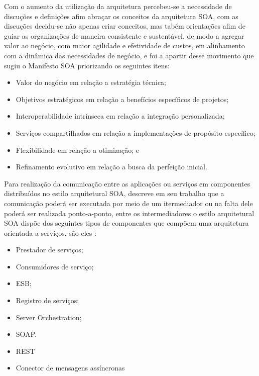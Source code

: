Com o aumento da utilização da arquitetura percebeu-se a necessidade de discuções e definições afim abraçar os conceitos da arquitetura \acrshort{SOA}, com as discuções decidu-se não apenas criar conceitos, mas tabém orientações  afim  de guiar as organizações de maneira consistente e sustentável, de modo a agregar valor ao negócio, com maior agilidade e efetividade de custos, em alinhamento com a dinâmica das necessidades de negócio, e foi a apartir desse movimento que sugiu o Manifesto \acrshort{SOA} \cite{erl2009soa} priorizando os seguintes itens:

\begin{itemize}

\item Valor do negócio em relação a estratégia técnica;

\item Objetivos estratégicos em relação a benefícios específicos de projetos;

\item Interoperabilidade intrínseca em relação a integração personalizada;

\item Serviços compartilhados em relação a implementações de propósito específico;

\item Flexibilidade em relação a otimização; e

\item Refinamento evolutivo em relação a busca da perfeição inicial.

\end{itemize}

Para realização da comunicação entre as aplicações ou serviços em componentes distribuídos no estilo arquitetural \acrshort{SOA}, \cite{clements2002documenting} descreve em seu trabalho que a comunicação poderá ser executada por meio de um itermediador ou na falta dele poderá ser realizada ponto-a-ponto, entre os intermediadores o estilo arquitetural \acrshort{SOA} dispõe dos seguintes tipos de componentes que compõem uma arquitetura orientada a serviços, são eles \cite{bass2003software}:

\begin{itemize}

\item Prestador de serviços;

\item Consumidores de serviço;

\item \acrfull{ESB};

\item Registro de serviços;

\item Server Orchestration; 

\item \acrfull{SOAP}.

\item \acrfull{REST}

\item Conector de mensagens assíncronas

\end{itemize}

